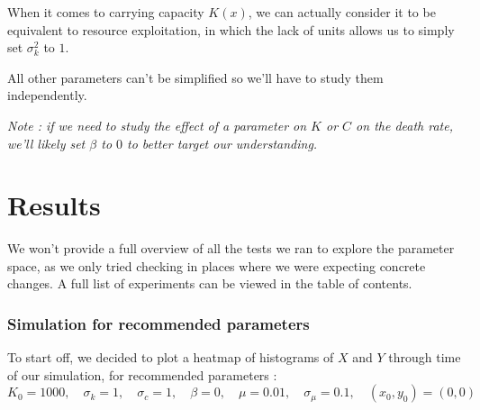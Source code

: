 \documentclass{article}
\begin{document}
When it comes to carrying capacity $K(x)$, we can actually consider it to be equivalent to resource exploitation, in which the lack of units allows us to simply set $\sigma_k^2$ to $1$. \\
\vspace{5mm}

All other parameters can't be simplified so we'll have to study them independently. \\
\vspace{5mm}

\textit{Note : if we need to study the effect of a parameter on $K$ or $C$ on the death rate, we'll likely set $\beta$ to $0$ to better target our understanding.}


\section{Results}

We won't provide a full overview of all the tests we ran to explore the parameter space, as we only tried checking in places where we were expecting concrete changes. A full list of experiments can be viewed in the table of contents. \\
\vspace{5mm}

\subsubsection{Simulation for recommended parameters}

To start off, we decided to plot a heatmap of histograms of $X$ and $Y$ through time of our simulation, for recommended parameters : \\
$$K_0 = 1000, \quad \sigma_k = 1, \quad \sigma_c = 1, \quad \beta = 0, \quad \mu = 0.01, \quad \sigma_{\mu} = 0.1, \quad (x_0, y_0) = (0,0)$$
\end{document}
